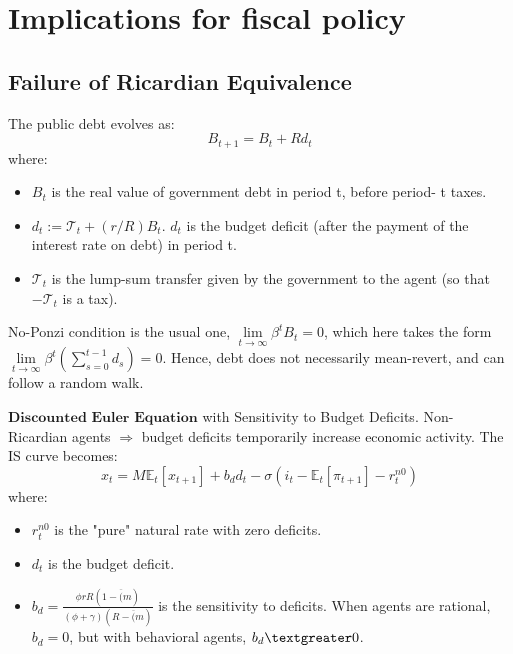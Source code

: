 \documentclass{beamer}
\newcommand\ReduceFont{\fontsize{10}{7.2}\selectfont}
\begin{document}
\section{Implications for fiscal policy}
\begin{frame}
    \ReduceFont
\end{frame}

\begin{frame}
    \tableofcontents[currentsection, hideothersubsections, sections=\value{section}]
\end{frame}

\subsection{Failure of Ricardian Equivalence}

\begin{frame}{\subsecname}
    The public debt evolves as:
    \begin{equation}\tag{43}
        B_{t+1}=B_{t}+R d_{t}
    \end{equation}
    where:
    \begin{itemize}
        \item $B_{t}$ is the real value of government debt in period t, before period- t taxes.
        \item $d_{t}:=\mathcal{T}_{t}+(r/R)B_{t}$. $d_{t}$ is the budget deficit (after the payment of the interest rate on debt) in period t.
        \item $\mathcal{T}_{t}$ is the lump-sum transfer given by the government to the agent (so that $-\mathcal{T}_{t}$ is a tax).
    \end{itemize}
    No-Ponzi condition is the usual one, $\lim\limits_{t\to\infty}\beta^{t}B_{t}=0$, which here takes the form $\lim\limits_{t\to\infty}\beta^{t}\left(\sum_{s=0}^{t-1}d_{s}\right)=0$. Hence, debt does not necessarily mean-revert, and can follow a random walk.
\end{frame}

\begin{frame}{\subsecname}
    $\textbf{Discounted Euler Equation}$ with Sensitivity to Budget Deficits. Non-Ricardian agents $\Rightarrow$ budget deficits temporarily increase economic activity. The IS curve becomes:
    \begin{equation}\tag{44}            x_{t}=M\mathbb{E}_{t}\left[x_{t+1}\right]+b_{d}d_{t}-\sigma\left(i_{t}-\mathbb{E}_{t}\left[\pi_{t+1}\right]-r_{t}^{n0}\right)
    \end{equation}
    where:
    \begin{itemize}
        \item $r_{t}^{n0}$ is the "pure" natural rate with zero deficits.
        \item $d_{t}$ is the budget deficit.
        \item $b_{d}=\frac{\phi rR(1-\overline(m)}{(\phi+\gamma)(R-\overline(m)}$ is the sensitivity to deficits. When agents are rational, $b_{d}=0$, but with behavioral agents, $b_{d}\textgreater0$.
    \end{itemize}
\end{frame}
\end{document}
